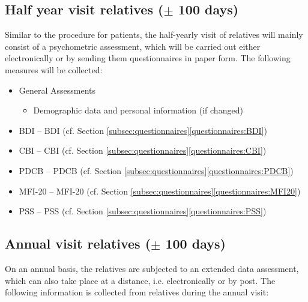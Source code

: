 \subsection{Half year visit relatives ($\pm$ 100 days)}
Similar to the procedure for patients, the half-yearly visit of relatives will mainly consist of a psychometric assessment, which will be carried out either electronically or by sending them questionnaires in paper form. The following measures will be collected:

\begin{itemize}[noitemsep,topsep=0pt]
\item General Assessments
\begin{itemize}[noitemsep,topsep=0pt]
\item Demographic data and personal information (if changed)
\end{itemize}
\item \acl{BDI} -- \acs{BDI} (cf. Section \ref{subsec:questionnaires}\ref{questionnaires:BDI})
\item \acl{CBI} -- \acs{CBI} (cf. Section \ref{subsec:questionnaires}\ref{questionnaires:CBI})
\item \acl{PDCB} -- \acs{PDCB} (cf. Section \ref{subsec:questionnaires}\ref{questionnaires:PDCB})
\item \acl{MFI-20} -- \acs{MFI-20} (cf. Section \ref{subsec:questionnaires}\ref{questionnaires:MFI20})
\item \acl{PSS} -- \acs{PSS} (cf. Section \ref{subsec:questionnaires}\ref{questionnaires:PSS})
\end{itemize}


\subsection{Annual visit relatives ($\pm$ 100 days)}
On an annual basis, the relatives are subjected to an extended data assessment, which can also take place at a distance, i.e. electronically or by post. The following information is collected from relatives during the annual visit:

